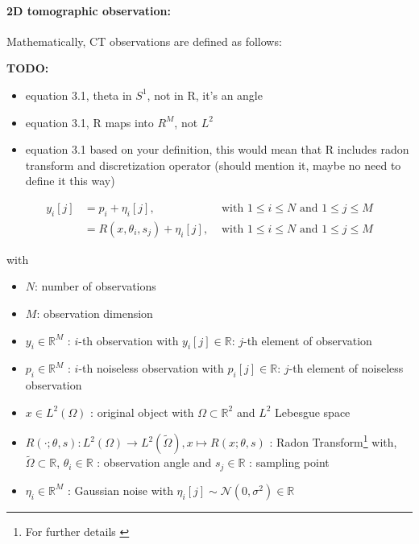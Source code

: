 \paragraph{2D tomographic observation:}

Mathematically, CT observations are defined as follows:

\textbf{TODO:}
\begin{itemize}
    \item equation 3.1, theta in $S^1$, not in R, it's an angle
    \item equation 3.1, R maps into $R^M$, not $L^2$ 
    \item equation 3.1 based on your definition, this would mean that R includes radon transform and discretization operator 
        (should mention it, maybe no need to define it this way)

\end{itemize}

\begin{equation}
    \label{eq:2Dreconstruction}
    \begin{aligned}
        y_i[j] &= p_i + \eta_i[j], & \text{ with } 1 \leq i \leq N \text{ and } 1 \leq j \leq M \\
               &= R(x, \theta_i, s_j) + \eta_i[j], & \text{ with } 1 \leq i \leq N \text{ and } 1 \leq j \leq M
    \end{aligned}
\end{equation}

with
\begin{itemize}
    \item $N$: number of observations
    \item $M$: observation dimension
    \item $y_i \in \mathbb{R}^M$ :  $i$-th observation with $y_i[j] \in \mathbb{R}$: $j$-th element of observation
    \item $p_i \in \mathbb{R}^M$ :  $i$-th noiseless observation with $p_i[j] \in \mathbb{R}$: $j$-th element of noiseless observation
    \item $x \in L^2(\Omega)$ : original object with $\Omega \subset \mathbb{R}^2 $ and $L^2$ Lebesgue space
    \item $R(\cdot; \theta, s): L^2(\Omega) \to L^2(\tilde{\Omega}) , x \mapsto R(x; \theta,s)$ : Radon Transform\footnote{For further details \cite{radonTransform}} 
        with, $\tilde{\Omega} \subset \mathbb{R}$, $\theta_i \in \mathbb{R}$ : observation angle and $s_j \in \mathbb{R}$ : sampling point 
    \item $\eta_i \in \mathbb{R}^M$ : Gaussian noise with $\eta_i[j] \sim \mathcal{N}(0,\sigma^2) \in \mathbb{R}$
\end{itemize}


